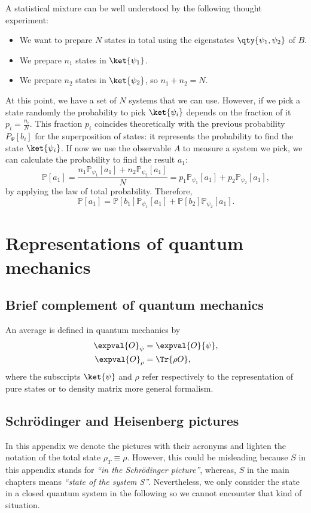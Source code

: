 A statistical mixture can be well understood by the following thought experiment:
\begin{itemize}
    \item We want to prepare $N$ states in total using the eigenstates $\qty{\psi_1,\psi_2}$ of $B$.
    \item We prepare $n_1$ states in $\ket{\psi_1}$.
    \item We prepare $n_2$ states in $\ket{\psi_2}$, so $n_1+n_2=N$.
\end{itemize}
At this point, we have a set of $N$ systems that we can use. However, if we pick a state randomly the probability to pick $\ket{\psi_i}$ depends on the fraction of it $p_i=\frac{n_i}{N}$. This fraction $p_i$ coincides theoretically with the previous probability $P_\Psi[b_i]$ for the superposition of states: it represents the probability to find the state $\ket{\psi_i}$. If now we use the observable $A$ to measure a system we pick, we can calculate the probability to find the result $a_1$:
\begin{equation*}
    \mathbb{P}[a_1] = \frac{n_1\mathbb{P}_{\psi_1}[a_1]+n_2\mathbb{P}_{\psi_2}[a_1]}{N} = p_1\mathbb{P}_{\psi_1}[a_1]+p_2\mathbb{P}_{\psi_2}[a_1],
\end{equation*}
by applying the law of total probability. Therefore,
\begin{equation}
    \boxed{\mathbb{P}[a_1] =\mathbb{P}[b_1]\mathbb{P}_{\psi_1}[a_1]+\mathbb{P}[b_2]\mathbb{P}_{\psi_2}[a_1]}.
\end{equation}

\newpage
\section{Representations of quantum mechanics}\label{ann:pictures}
\subsection*{Brief complement of quantum mechanics}
An average is defined in quantum mechanics by
\begin{align*}
    \expval{O}_\psi&=\expval{O}{\psi},\\
    \expval{O}_\rho&=\Tr{\rho O},
\end{align*}
where the subscripts $\ket{\psi}$ and $\rho$ refer respectively to the representation of pure states or
to density matrix more general formalism. 
\subsection{Schrödinger and Heisenberg pictures}\noindent
In this appendix we denote the pictures with their acronyms and lighten the notation of the total state $\rho_T\equiv\rho$. However, this could be misleading because $S$ in this appendix stands for \textit{``in the Schrödinger picture''}, whereas, $S$ in the main chapters means \textit{``state of the system S''}. Nevertheless, we only consider the state in a closed quantum system in the following so we cannot encounter that kind of situation.

